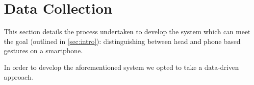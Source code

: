 \section{Data Collection} %



This section details the process undertaken to develop the system which can meet the goal (outlined in \autoref{sec:intro}): distinguishing between head and phone based gestures on a smartphone.


In order to develop the aforementioned system we opted to take a data-driven approach.

